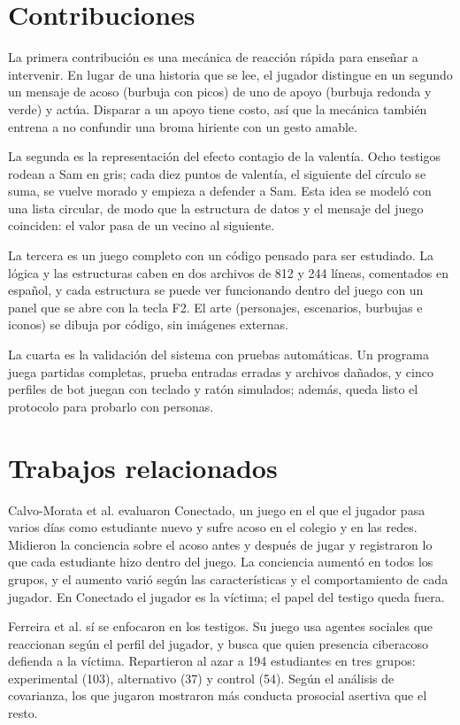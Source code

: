 \documentclass[conference]{IEEEtran}
\begin{document}
\section{Contribuciones}

La primera contribución es una mecánica de reacción rápida para enseñar a intervenir. En lugar de una historia que se lee, el jugador distingue en un segundo un mensaje de acoso (burbuja con picos) de uno de apoyo (burbuja redonda y verde) y actúa. Disparar a un apoyo tiene costo, así que la mecánica también entrena a no confundir una broma hiriente con un gesto amable.

La segunda es la representación del efecto contagio de la valentía. Ocho testigos rodean a Sam en gris; cada diez puntos de valentía, el siguiente del círculo se suma, se vuelve morado y empieza a defender a Sam. Esta idea se modeló con una lista circular, de modo que la estructura de datos y el mensaje del juego coinciden: el valor pasa de un vecino al siguiente.

La tercera es un juego completo con un código pensado para ser estudiado. La lógica y las estructuras caben en dos archivos de 812 y 244 líneas, comentados en español, y cada estructura se puede ver funcionando dentro del juego con un panel que se abre con la tecla F2. El arte (personajes, escenarios, burbujas e iconos) se dibuja por código, sin imágenes externas.

La cuarta es la validación del sistema con pruebas automáticas. Un programa juega partidas completas, prueba entradas erradas y archivos dañados, y cinco perfiles de bot juegan con teclado y ratón simulados; además, queda listo el protocolo para probarlo con personas.

\section{Trabajos relacionados}

Calvo-Morata et al. \cite{ref5} evaluaron Conectado, un juego en el que el jugador pasa varios días como estudiante nuevo y sufre acoso en el colegio y en las redes. Midieron la conciencia sobre el acoso antes y después de jugar y registraron lo que cada estudiante hizo dentro del juego. La conciencia aumentó en todos los grupos, y el aumento varió según las características y el comportamiento de cada jugador. En Conectado el jugador es la víctima; el papel del testigo queda fuera.

Ferreira et al. \cite{ref3} sí se enfocaron en los testigos. Su juego usa agentes sociales que reaccionan según el perfil del jugador, y busca que quien presencia ciberacoso defienda a la víctima. Repartieron al azar a 194 estudiantes en tres grupos: experimental (103), alternativo (37) y control (54). Según el análisis de covarianza, los que jugaron mostraron más conducta prosocial asertiva que el resto.
\end{document}
